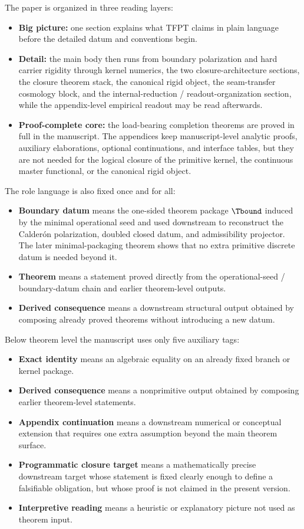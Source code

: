 The paper is organized in three reading layers:
\begin{itemize}[leftmargin=1.5em, topsep=3pt, itemsep=2pt]
    \item \textbf{Big picture:} one section explains what TFPT claims in plain language before the detailed datum and conventions begin.
    \item \textbf{Detail:} the main body then runs from boundary polarization and hard carrier rigidity through kernel numerics, the two closure-architecture sections, the closure theorem stack, the canonical rigid object, the seam-transfer cosmology block, and the internal-reduction / readout-organization section, while the appendix-level empirical readout may be read afterwards.
    \item \textbf{Proof-complete core:} the load-bearing completion theorems are proved in full in the manuscript.
    The appendices keep manuscript-level analytic proofs, auxiliary elaborations, optional
    continuations, and interface tables, but they are not needed for the logical closure of the
    primitive kernel, the continuous master functional, or the canonical rigid object.
\end{itemize}
The role language is also fixed once and for all:
\begin{itemize}[leftmargin=1.5em, topsep=3pt, itemsep=2pt]
    \item \textbf{Boundary datum} means the one-sided theorem package $\Tbound$ induced by the minimal operational seed and used downstream to reconstruct the Calder\'on polarization, doubled closed datum, and admissibility projector. The later minimal-packaging theorem shows that no extra primitive discrete datum is needed beyond it.
    \item \textbf{Theorem} means a statement proved directly from the operational-seed / boundary-datum chain and earlier theorem-level outputs.
    \item \textbf{Derived consequence} means a downstream structural output obtained by composing already proved theorems without introducing a new datum.
\end{itemize}
Below theorem level the manuscript uses only five auxiliary tags:
\begin{itemize}[leftmargin=1.5em, topsep=3pt, itemsep=2pt]
    \item \textbf{Exact identity} means an algebraic equality on an already fixed branch or kernel package.
    \item \textbf{Derived consequence} means a nonprimitive output obtained by composing earlier theorem-level statements.
    \item \textbf{Appendix continuation} means a downstream numerical or conceptual extension that requires one extra assumption beyond the main theorem surface.
    \item \textbf{Programmatic closure target} means a mathematically precise downstream target whose statement is fixed clearly enough to define a falsifiable obligation, but whose proof is not claimed in the present version.
    \item \textbf{Interpretive reading} means a heuristic or explanatory picture not used as theorem input.
\end{itemize}
